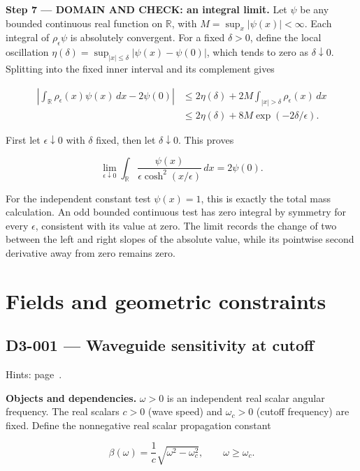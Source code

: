 \documentclass[11pt,oneside,openany]{book}
\begin{document}
\begin{DomainStep}
\textbf{Step 7 --- DOMAIN AND CHECK: an integral limit.} Let \(\psi\) be any bounded continuous real function on \(\mathbb R\), with \(M=\sup_x|\psi(x)|<\infty\). Each integral of \(\rho_\epsilon\psi\) is absolutely convergent. For a fixed \(\delta>0\), define the local oscillation \(\eta(\delta)=\sup_{|x|\le\delta}|\psi(x)-\psi(0)|\), which tends to zero as \(\delta\downarrow0\). Splitting into the fixed inner interval and its complement gives

\[
\begin{aligned}
\left|\int_{\mathbb R}\rho_\epsilon(x)\psi(x)\,dx-2\psi(0)\right|
&\le2\eta(\delta)+2M\int_{|x|>\delta}\rho_\epsilon(x)\,dx\\
&\le2\eta(\delta)+8M\exp(-2\delta/\epsilon).
\end{aligned}
\]

First let \(\epsilon\downarrow0\) with \(\delta\) fixed, then let \(\delta\downarrow0\). This proves

\[
\lim_{\epsilon\downarrow0}\int_{\mathbb R}
\frac{\psi(x)}{\epsilon\cosh^2(x/\epsilon)}\,dx=2\psi(0).
\]

For the independent constant test \(\psi(x)=1\), this is exactly the total mass calculation. An odd bounded continuous test has zero integral by symmetry for every \(\epsilon\), consistent with its value at zero. The limit records the change of two between the left and right slopes of the absolute value, while its pointwise second derivative away from zero remains zero.
\end{DomainStep}

\chapter{Fields and geometric constraints}
\markright{}
\section{D3-001 --- Waveguide sensitivity at cutoff}
\label{problem:D3-001}
{\small Hints: page~\pageref{hints:D3-001}.}\par\medskip

\textbf{Objects and dependencies.} \(\omega>0\) is an independent real scalar angular frequency. The real scalars \(c>0\) (wave speed) and \(\omega_c>0\) (cutoff frequency) are fixed. Define the nonnegative real scalar propagation constant

\[
\beta(\omega)=\frac{1}{c}\sqrt{\omega^2-\omega_c^2},\qquad \omega\ge\omega_c.
\]
\end{document}
